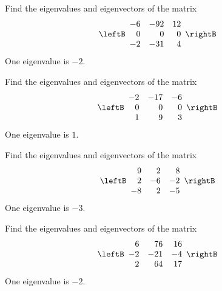 \begin{enumialphparenastyle}

\begin{ex} Find the eigenvalues and eigenvectors of the matrix 
\begin{equation*}
\leftB
\begin{array}{rrr}
-6 & -92 & 12 \\
0 & 0 & 0 \\
-2 & -31 & 4
\end{array}
\rightB
\end{equation*}
One eigenvalue is $-2$.
\end{ex}


\begin{ex} Find the eigenvalues and eigenvectors of the matrix 
\begin{equation*}
\leftB
\begin{array}{rrr}
-2 & -17 & -6 \\
0 & 0 & 0 \\
1 & 9 & 3
\end{array}
\rightB
\end{equation*}
One eigenvalue is $1.$ 
\end{ex}

\begin{ex} Find the eigenvalues and eigenvectors of the matrix 
\begin{equation*}
\leftB
\begin{array}{rrr}
9 & 2 & 8 \\
2 & -6 & -2 \\
-8 & 2 & -5
\end{array}
\rightB
\end{equation*}
One eigenvalue is $-3.$ 
\end{ex}

\begin{ex} Find the eigenvalues and eigenvectors of the matrix 
\begin{equation*}
\leftB
\begin{array}{rrr}
6 & 76 & 16 \\
-2 & -21 & -4 \\
2 & 64 & 17
\end{array}
\rightB
\end{equation*}
One eigenvalue is $-2.$ 
\end{ex}


\end{enumialphparenastyle}
